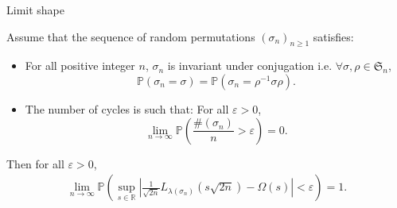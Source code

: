 \documentclass[english,xcolor=table]{beamer}
\begin{document}
 \begin{frame}{Limit shape}
    \begin{theorem}[\cite{sk}]
Assume that the sequence of random permutations  $(\sigma_n)_{n\geq 1}$ satisfies:
\begin{itemize}
\item  For all positive integer $n$, $\sigma_n$ is invariant under conjugation i.e.  $\forall \sigma , \rho \in \mathfrak{S}_n$,
\begin{equation}\tag{H1}
\mathbb{P}(\sigma_n=\sigma)=\mathbb{P}(\sigma_n=\rho^{-1}\sigma\rho).
\end{equation}
\item The number of cycles is such that: For all $\varepsilon>0$,
\begin{equation}\tag{H3}
\lim_{n\to \infty}\mathbb{P}\left(\frac{\#(\sigma_n)}{n}>\varepsilon\right) =0.
\end{equation}
\end{itemize}
Then  for all  $\varepsilon>0$,
\begin{align*}
\lim_{n\to \infty} \mathbb{P}\left(\sup_{s\in \mathbb{R}} \left|\frac{1}{\sqrt{2n}}L_{\lambda(\sigma_n)}\left({s}{\sqrt{2n}}\right)-\Omega(s)\right|<\varepsilon\right) =1.
\end{align*}
\end{theorem}
\end{frame}
\end{document}
